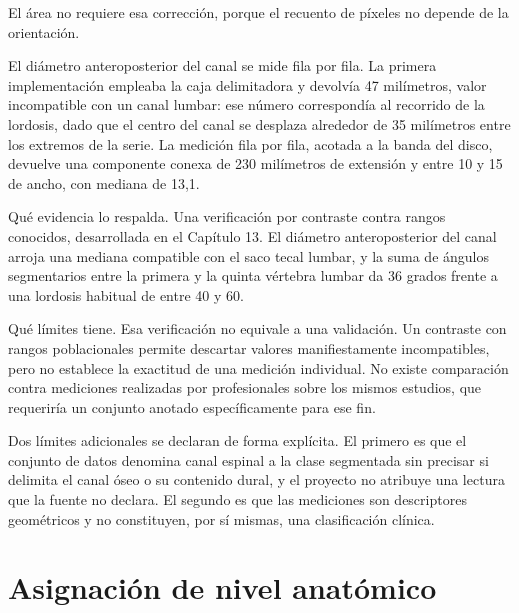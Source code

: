 El área no requiere esa corrección, porque el recuento de píxeles no depende de la orientación.

El diámetro anteroposterior del canal se mide fila por fila. La primera implementación empleaba la caja delimitadora y devolvía 47 milímetros, valor incompatible con un canal lumbar: ese número correspondía al recorrido de la lordosis, dado que el centro del canal se desplaza alrededor de 35 milímetros entre los extremos de la serie. La medición fila por fila, acotada a la banda del disco, devuelve una componente conexa de 230 milímetros de extensión y entre 10 y 15 de ancho, con mediana de 13,1.

Qué evidencia lo respalda. Una verificación por contraste contra rangos conocidos, desarrollada en el Capítulo 13. El diámetro anteroposterior del canal arroja una mediana compatible con el saco tecal lumbar, y la suma de ángulos segmentarios entre la primera y la quinta vértebra lumbar da 36 grados frente a una lordosis habitual de entre 40 y 60.

Qué límites tiene. Esa verificación no equivale a una validación. Un contraste con rangos poblacionales permite descartar valores manifiestamente incompatibles, pero no establece la exactitud de una medición individual. No existe comparación contra mediciones realizadas por profesionales sobre los mismos estudios, que requeriría un conjunto anotado específicamente para ese fin.

Dos límites adicionales se declaran de forma explícita. El primero es que el conjunto de datos denomina canal espinal a la clase segmentada sin precisar si delimita el canal óseo o su contenido dural, y el proyecto no atribuye una lectura que la fuente no declara. El segundo es que las mediciones son descriptores geométricos y no constituyen, por sí mismas, una clasificación clínica.

\section{Asignación de nivel anatómico}
\label{sec:cap-asignacion-nivel-anatomico}


